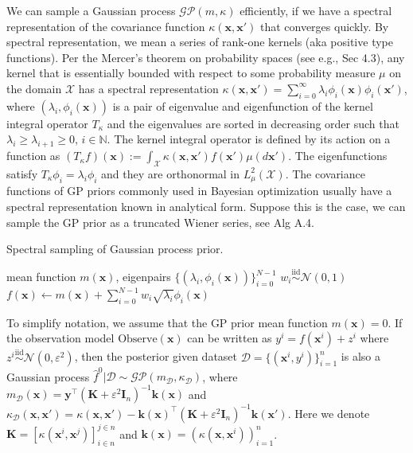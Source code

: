 \documentclass{article}
\begin{document}
We can sample a Gaussian process $\mathcal{GP}(m, \kappa)$
efficiently, if we have a spectral representation of the covariance
function $\kappa(\mathbf{x}, \mathbf{x}')$ that converges quickly. By
spectral representation, we mean a series of rank-one kernels (aka
positive type functions). Per the Mercer's theorem on probability spaces
(see e.g., \cite{Rasmussen2006} Sec 4.3), any kernel that is
essentially bounded with respect to some probability measure $\mu$ on
the domain $\mathcal{X}$ has a spectral representation
$\kappa(\mathbf{x}, \mathbf{x}') = \sum_{i=0}^\infty \lambda_i \phi_i(\mathbf{x}) \phi_i(\mathbf{x}')$,
where $(\lambda_i, \phi_i(\mathbf{x}))$ is a pair of eigenvalue and
eigenfunction of the kernel integral operator $T_\kappa$ and the
eigenvalues are sorted in decreasing order such that
$\lambda_i \ge \lambda_{i+1} \ge 0$, $i \in \mathbb{N}$. The kernel
integral operator is defined by its action on a function as
$(T_\kappa f)(\mathbf{x}) := \int_{\mathcal{X}} \kappa(\mathbf{x}, \mathbf{x}') f(\mathbf{x}') \mu(d \mathbf{x}')$.
The eigenfunctions satisfy $T_\kappa \phi_i = \lambda_i \phi_i$ and
they are orthonormal in $L^2_\mu(\mathcal{X})$. The covariance
functions of GP priors commonly used in Bayesian optimization usually
have a spectral representation known in analytical form. Suppose this is
the case, we can sample the GP prior as a truncated Wiener series, see
Alg A.4.

\begin{algorithm}[h]
  \caption{Spectral sampling of Gaussian process prior.}
  \label{alg:sam_priorGP}
  \begin{algorithmic}[1] %
    \Input mean function $m(\mathbf{x})$, eigenpairs
  $\{(\lambda_i, \phi_i(\mathbf{x}))\}_{i=0}^{N-1}$
    \State $w_i \overset{\text{iid}}{\sim} \mathcal{N}(0,1)$
    \State \Return $f(\mathbf{x}) \gets m(\mathbf{x}) + \sum_{i=0}^{N-1} w_i \sqrt{\lambda_i} \phi_i(\mathbf{x})$
  \end{algorithmic}
\end{algorithm}

To simplify notation, we assume that the GP prior mean function
$m(\mathbf{x}) = 0$. If the observation model
$\mathrm{Observe}(\mathbf{x})$ can be written as
$y^i = f(\mathbf{x}^i) + z^i$ where
$z^i \overset{\text{iid}}{\sim} \mathcal{N}(0, \varepsilon^2)$, then the
posterior given dataset
$\mathcal{D} = \{(\mathbf{x}^i, y^i)\}_{i=1}^n$ is also a Gaussian
process
$\widehat{f}^0 | \mathcal{D} \sim \mathcal{GP}(m_{\mathcal{D}}, \kappa_{\mathcal{D}})$,
where
$m_{\mathcal{D}}(\mathbf{x}) = \mathbf{y}^\intercal (\mathbf{K} + \varepsilon^2 \mathbf{I}_n)^{-1} \mathbf{k}(\mathbf{x})$
and
$\kappa_{\mathcal{D}}(\mathbf{x}, \mathbf{x}') = \kappa(\mathbf{x}, \mathbf{x}') - \mathbf{k}(\mathbf{x})^\intercal (\mathbf{K} + \varepsilon^2 \mathbf{I}_n)^{-1} \mathbf{k}(\mathbf{x}')$.
Here we denote
$\mathbf{K} = [\kappa(\mathbf{x}^i, \mathbf{x}^j)]_{i \in n}^{j \in n}$
and
$\mathbf{k}(\mathbf{x}) = (\kappa(\mathbf{x}, \mathbf{x}^i))_{i=1}^n$.
\end{document}
